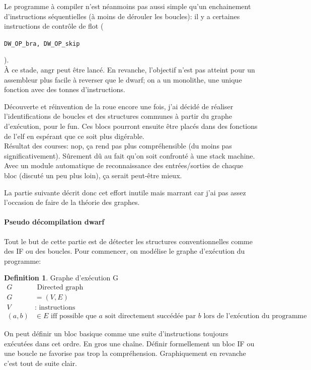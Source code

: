 \documentclass[14pt]{article}
\newcommand{\inlinebox}[2]{%
\colorbox{bg}{%
\parbox[b][0.6em]{\widthof{\texttt{#2}}}{\texttt{#2}}
}
}
\newcommand{\inlinec}[1]{ \inlinebox{c}{#1} }
\theoremstyle{definition}
\newtheorem{definition}{Definition}[section]
\begin{document}
Le programme à compiler n'est néanmoins pas aussi simple qu'un enchainement d'instructions séquentielles (à moins de dérouler les boucles): il y a certaines instructions de contrôle de flot (\inlinec{DW_OP_bra, DW_OP_skip}). \\ 

À ce stade, angr peut être lancé. En revanche, l'objectif n'est pas atteint pour un assembleur plus facile à reverser que le dwarf; on a un monolithe, une unique fonction avec des tonnes d'instructions.

Découverte et réinvention de la roue encore une fois, j'ai décidé de réaliser l'identifications de boucles et des structures communes à partir du graphe d'exécution, pour le fun. Ces blocs pourront ensuite être placés dans des fonctions de l'elf en espérant que ce soit plus digérable. \\ 

Résultat des courses: nop, ça rend pas plus compréhensible (du moins pas significativement). Sûrement dû au fait qu'on soit confronté à une stack machine. Avec un module automatique de reconnaissance des entrées/sorties de chaque bloc (discuté un peu plus loin), ça serait peut-être mieux.

La partie suivante décrit donc cet effort inutile mais marrant car j'ai pas assez l'occasion de faire de la théorie des graphes.

\paragraph{Pseudo décompilation dwarf}
Tout le but de cette partie est de détecter les structures conventionnelles comme des IF ou des boucles. 
Pour commencer, on modélise le graphe d'exécution du programme:

\theoremstyle{definition}
\begin{definition}{Graphe d'exécution G}
  \begin{align*}
    G & \text{ Directed graph} \\ 
    G&=(V,E) \\ 
    V&: \text{ instructions} \\ 
    (a,b) & \in E \text{ iff possible que $a$ soit directement succédée par $b$ lors de l'exécution du programme}
  \end{align*}
\end{definition}
On peut définir un bloc basique comme une suite d'instructions toujours exécutées dans cet ordre. En gros une chaîne.
Définir formellement un bloc IF ou une boucle ne favorise pas trop la compréhension. Graphiquement en revanche c'est tout de suite clair.
\end{document}
